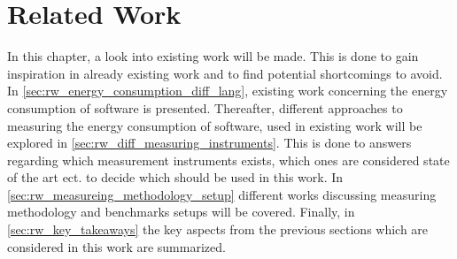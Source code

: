 \chapter{Related Work}\label{ch:related_work}

In this chapter, a look into existing work will be made. This is done to gain inspiration in already existing work and to find potential shortcomings to avoid. In \cref{sec:rw_energy_consumption_diff_lang}, existing work concerning the energy consumption of software is presented. Thereafter, different approaches to measuring the energy consumption of software, used in existing work will be explored in \cref{sec:rw_diff_measuring_instruments}. This is done to answers regarding which measurement instruments exists, which ones are considered state of the art ect. to decide which should be used in this work. In \cref{sec:rw_measureing_methodology_setup} different works discussing measuring methodology and benchmarks setups will be covered. Finally, in \cref{sec:rw_key_takeaways} the key aspects from the previous sections which are considered in this work are summarized.


% 


